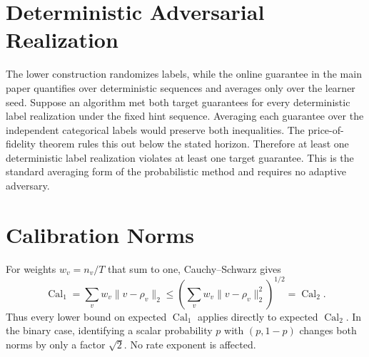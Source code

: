 \documentclass[twoside]{article}
\newcommand{\calone}{\operatorname{Cal}_1}
\newcommand{\caltwo}{\operatorname{Cal}_2}
\newcommand{\1}{\mathbf 1}
\begin{document}
\section{Deterministic Adversarial Realization}

The lower construction randomizes labels, while the online guarantee in the
main paper quantifies over deterministic sequences and averages only over the
learner seed. Suppose an algorithm met both target guarantees for every
deterministic label realization under the fixed hint sequence. Averaging each
guarantee over the independent categorical labels would preserve both
inequalities. The price-of-fidelity theorem rules this out below the stated
horizon. Therefore at least one deterministic label realization violates at
least one target guarantee. This is the standard averaging form of the
probabilistic method and requires no adaptive adversary.

\section{Calibration Norms}

For weights $w_v=n_v/T$ that sum to one, Cauchy--Schwarz gives
\[
 \calone
 =\sum_vw_v\|v-\rho_v\|_2
 \leq\left(\sum_vw_v\|v-\rho_v\|_2^2\right)^{1/2}
 =\caltwo.
\]
Thus every lower bound on expected $\calone$ applies directly to expected
$\caltwo$. In the binary case, identifying a scalar probability $p$ with
$(p,1-p)$ changes both norms by only a factor $\sqrt2$. No rate exponent is
affected.


\end{document}
